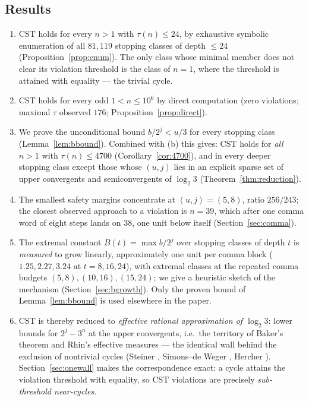 \documentclass[10pt]{article}
\theoremstyle{definition}
\theoremstyle{remark}
\newcommand{\lb}{\log_2 3}
\begin{document}
\subsection*{Results}

\begin{enumerate}
\item[(a)] CST holds for every $n>1$ with $\tau(n) \le 24$, by exhaustive
symbolic enumeration of all $81{,}119$ stopping classes of depth $\le 24$
(Proposition~\ref{prop:enum}). The only class whose minimal member does not
clear its violation threshold is the class of $n=1$, where the threshold is
attained with equality --- the trivial cycle.
\item[(b)] CST holds for every odd $1 < n \le 10^{6}$ by direct computation
(zero violations; maximal $\tau$ observed $176$;
Proposition~\ref{prop:direct}).
\item[(c)] We prove the unconditional bound $b/2^{j} < u/3$ for every stopping
class (Lemma~\ref{lem:bbound}). Combined with (b) this gives: CST holds for
\emph{all} $n > 1$ with $\tau(n) \le 4700$ (Corollary~\ref{cor:4700}), and in
every deeper stopping class except those whose $(u,j)$ lies in an explicit
sparse set of upper convergents and semiconvergents of $\lb$
(Theorem~\ref{thm:reduction}).
\item[(d)] The smallest safety margins concentrate at $(u,j) = (5,8)$, ratio
$256/243$; the closest observed approach to a violation is $n = 39$, which
after one comma word of eight steps lands on $38$, one unit below itself
(Section~\ref{sec:comma}).
\item[(e)] The extremal constant $B(t) = \max b/2^{j}$ over stopping classes
of depth $t$ is \emph{measured} to grow linearly, approximately one unit per
comma block ($1.25, 2.27, 3.24$ at $t = 8, 16, 24$), with extremal classes at
the repeated comma budgets $(5,8), (10,16), (15,24)$; we give a heuristic
sketch of the mechanism (Section~\ref{sec:bgrowth}). Only the proven bound of
Lemma~\ref{lem:bbound} is used elsewhere in the paper.
\item[(f)] CST is thereby reduced to \emph{effective rational approximation of
$\lb$}: lower bounds for $2^{j} - 3^{u}$ at the upper convergents, i.e.\ the
territory of Baker's theorem and Rhin's effective measures --- the identical
wall behind the exclusion of nontrivial cycles (Steiner \cite{Steiner1977},
Simons--de Weger \cite{SimonsDeWeger2005}, Hercher \cite{Hercher2023}).
Section~\ref{sec:onewall} makes the correspondence exact: a cycle attains the
violation threshold with equality, so CST violations are precisely
\emph{sub-threshold near-cycles}.
\end{enumerate}
\end{document}

